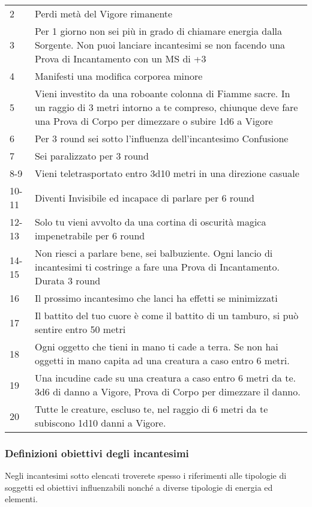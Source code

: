 \documentclass[12pt,a4paper,twoside,openany]{book}
\begin{document}
\begin{multicols}{2}
\medskip
{\small
	\begin{tabularx}{0.45\textwidth}{lX}
		\hline
2 & Perdi metà del Vigore rimanente\\
3 & Per 1 giorno non sei più in grado di chiamare energia dalla Sorgente. Non puoi lanciare incantesimi se non facendo una Prova di Incantamento con un MS di +3\\
4 & Manifesti una modifica corporea minore\\
5 & Vieni investito da una roboante colonna di Fiamme sacre. In un raggio di 3 metri intorno a te compreso, chiunque deve fare una Prova di Corpo per dimezzare o subire 1d6 a Vigore\\
6 & Per 3 round sei sotto l'influenza dell'incantesimo Confusione\\
7 & Sei paralizzato per 3 round\\
8-9 & Vieni teletrasportato entro 3d10 metri in una direzione casuale\\
10-11 & Diventi Invisibile ed incapace di parlare per 6 round\\
12-13 &  Solo tu vieni avvolto da una cortina di oscurità magica impenetrabile per 6 round\\
14-15 & Non riesci a parlare bene, sei balbuziente. Ogni lancio di incantesimi ti costringe a fare una Prova di Incantamento. Durata 3 round\\
16 & Il prossimo incantesimo che lanci ha effetti se minimizzati\\
17 & Il battito del tuo cuore è come il battito di un tamburo, si può sentire entro 50 metri\\
18 & Ogni oggetto che tieni in mano ti cade a terra. Se non hai oggetti in mano capita ad una creatura a caso entro 6 metri.\\
19 & Una incudine cade su una creatura a caso entro 6 metri da te. 3d6 di danno a Vigore, Prova di Corpo per dimezzare il danno.\\
20 & Tutte le creature, escluso te, nel raggio di 6 metri da te subiscono 1d10 danni a Vigore.
\end{tabularx}}



\subsubsection{Definizioni obiettivi degli incantesimi}\label{magiedefinizioniobiettivi}

Negli incantesimi sotto elencati troverete spesso i riferimenti alle tipologie di soggetti ed obiettivi influenzabili nonché a diverse tipologie di energia ed elementi.\\


\end{multicols}
\end{document}
